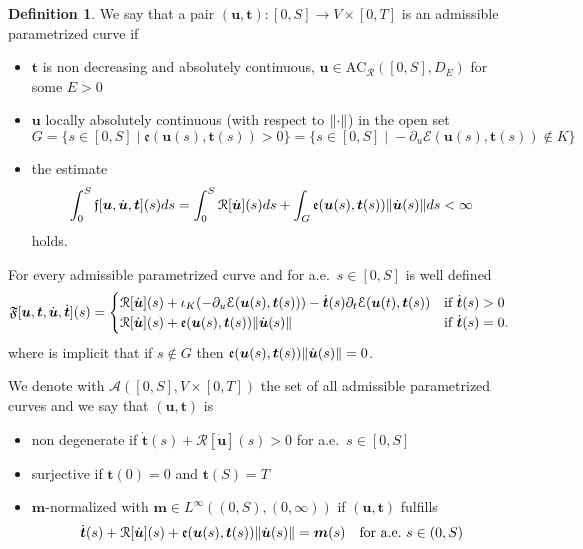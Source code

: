 \documentclass[letterpaper,oneside]{amsart}
\numberwithin{equation}{section}
\theoremstyle{definition}
\newtheorem{defi}[prop]{Definition}
\DeclarePairedDelimiter{\norm}{\lVert}{\rVert}
\begin{document}
\begin{defi}
We say that a pair $(\boldsymbol{u},\boldsymbol{t})\colon[0,S]\to V\times[0,T]$ is an admissible parametrized curve if
\begin{itemize}
\item[(i)] $\boldsymbol{t}$ is non decreasing and absolutely continuous, $\boldsymbol{u}\in\text{AC}_\mathcal{R}([0,S],D_E)$ for some $E>0$
\item[(ii)] $\boldsymbol{u}$ locally absolutely continuous (with respect to $\norm{\cdot}$) in the open set
\[
G=\{s\in[0,S]\;|\;\mathfrak{e}(\boldsymbol{u}(s),\boldsymbol{t}(s))>0\}=\{s\in[0,S]\;|\;-\partial_u\mathcal{E}(\boldsymbol{u}(s),\boldsymbol{t}(s))\notin K\}
\]
\item[(iii)] the estimate
\[
\int_0^S\mathfrak{f}[\boldsymbol{u},\dot{\boldsymbol{u}},\boldsymbol{t}](s)ds=\int_0^S\mathcal{R}[\dot{\boldsymbol{u}}](s)ds+\int_G\mathfrak{e}(\boldsymbol{u}(s),\boldsymbol{t}(s))\norm{\dot{\boldsymbol{u}}(s)}ds<\infty
\]
holds.
\end{itemize}
For every admissible parametrized curve and for a.e.\ $s\in[0,S]$ is well defined
\[
\mathfrak{F}[\boldsymbol{u},\boldsymbol{t},\dot{\boldsymbol{u}},\dot{\boldsymbol{t}}](s)=\begin{cases}
\mathcal{R}[\dot{\boldsymbol{u}}](s)+\iota_K(-\partial_u\mathcal{E}(\boldsymbol{u}(s),\boldsymbol{t}(s)))-\dot{\boldsymbol{t}}(s)\partial_t\mathcal{E}(\boldsymbol{u}(t),\boldsymbol{t}(s)) & \text{if $\dot{\boldsymbol{t}}(s)>0$} \\
\mathcal{R}[\dot{\boldsymbol{u}}](s)+\mathfrak{e}(\boldsymbol{u}(s),\boldsymbol{t}(s))\norm{\dot{\boldsymbol{u}}(s)} & \text{if $\dot{\boldsymbol{t}}(s)=0$}.
\end{cases}
\]
where is implicit that if $s\notin G$ then $\mathfrak{e}(\boldsymbol{u}(s),\boldsymbol{t}(s))\norm{\dot{\boldsymbol{u}}(s)}=0$.

We denote with $\mathscr{A}([0,S],V\times[0,T])$ the set of all admissible parametrized curves and we say that $(\boldsymbol{u},\boldsymbol{t})$ is
\begin{itemize}
\item[(i)] non degenerate if $\dot{\boldsymbol{t}}(s)+\mathcal{R}[\dot{\boldsymbol{u}}](s)>0$ for a.e.\ $s\in[0,S]$
\item[(ii)] surjective if $\boldsymbol{t}(0)=0$ and $\boldsymbol{t}(S)=T$
\item[(iii)] $\boldsymbol{m}$-normalized with $\boldsymbol{m}\in L^\infty((0,S),(0,\infty))$ if $(\boldsymbol{u},\boldsymbol{t})$ fulfills
\[
\dot{\boldsymbol{t}}(s)+\mathcal{R}[\dot{\boldsymbol{u}}](s)+\mathfrak{e}(\boldsymbol{u}(s),\boldsymbol{t}(s))\norm{\dot{\boldsymbol{u}}(s)}=\boldsymbol{m}(s)\quad\text{for a.e.\ $s\in(0,S)$}
\]
\end{itemize}
\end{defi}
\end{document}
